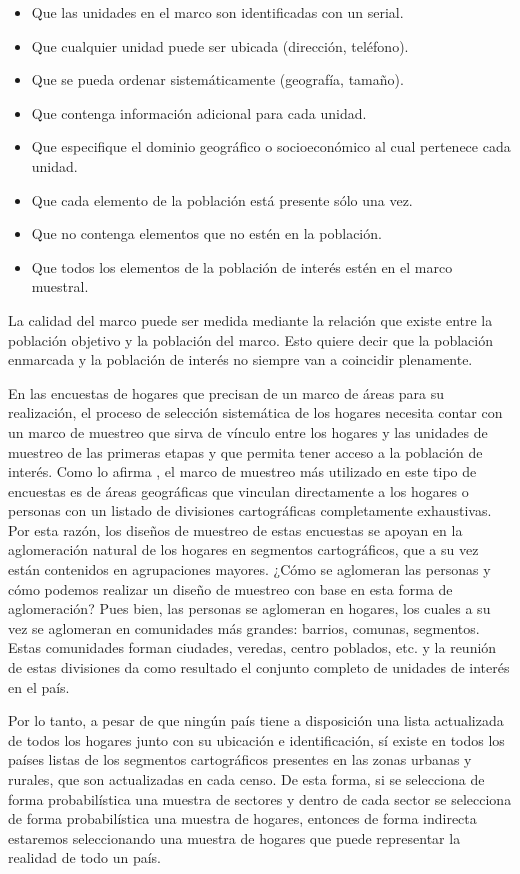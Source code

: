 \documentclass[
  12pt,
]{book}
\providecommand{\tightlist}{%
  \setlength{\itemsep}{0pt}\setlength{\parskip}{0pt}}
\begin{document}
\begin{itemize}
\tightlist
\item
  Que las unidades en el marco son identificadas con un serial.
\item
  Que cualquier unidad puede ser ubicada (dirección, teléfono).
\item
  Que se pueda ordenar sistemáticamente (geografía, tamaño).
\item
  Que contenga información adicional para cada unidad.
\item
  Que especifique el dominio geográfico o socioeconómico al cual pertenece cada unidad.
\item
  Que cada elemento de la población está presente sólo una vez.
\item
  Que no contenga elementos que no estén en la población.
\item
  Que todos los elementos de la población de interés estén en el marco muestral.
\end{itemize}

La calidad del marco puede ser medida mediante la relación que existe entre la población objetivo y la población del marco. Esto quiere decir que la población enmarcada y la población de interés no siempre van a coincidir plenamente.

En las encuestas de hogares que precisan de un marco de áreas para su realización, el proceso de selección sistemática de los hogares necesita contar con un marco de muestreo que sirva de vínculo entre los hogares y las unidades de muestreo de las primeras etapas y que permita tener acceso a la población de interés. Como lo afirma \citet{Gutierrez_2016}, el marco de muestreo más utilizado en este tipo de encuestas es de áreas geográficas que vinculan directamente a los hogares o personas con un listado de divisiones cartográficas completamente exhaustivas. Por esta razón, los diseños de muestreo de estas encuestas se apoyan en la aglomeración natural de los hogares en segmentos cartográficos, que a su vez están contenidos en agrupaciones mayores. ¿Cómo se aglomeran las personas y cómo podemos realizar un diseño de muestreo con base en esta forma de aglomeración? Pues bien, las personas se aglomeran en hogares, los cuales a su vez se aglomeran en comunidades más grandes: barrios, comunas, segmentos. Estas comunidades forman ciudades, veredas, centro poblados, etc. y la reunión de estas divisiones da como resultado el conjunto completo de unidades de interés en el país.

Por lo tanto, a pesar de que ningún país tiene a disposición una lista actualizada de todos los hogares junto con su ubicación e identificación, sí existe en todos los países listas de los segmentos cartográficos presentes en las zonas urbanas y rurales, que son actualizadas en cada censo. De esta forma, si se selecciona de forma probabilística una muestra de sectores y dentro de cada sector se selecciona de forma probabilística una muestra de hogares, entonces de forma indirecta estaremos seleccionando una muestra de hogares que puede representar la realidad de todo un país.
\end{document}
